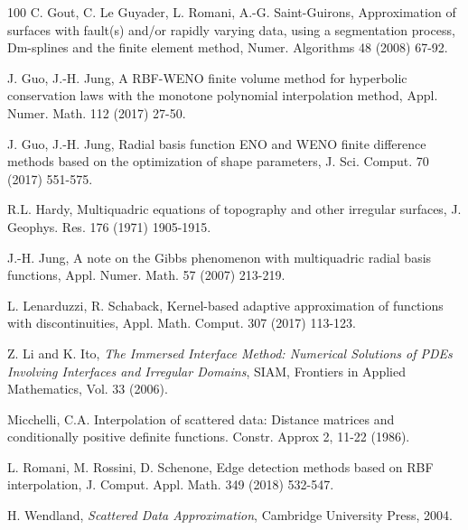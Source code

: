 \documentclass[preprint]{elsarticle}       %
\begin{document}
\begin{thebibliography}{100}
 C. Gout, C. Le Guyader, L. Romani, A.-G. Saint-Guirons, Approximation of surfaces with fault(s) and/or rapidly varying data, using a segmentation process, Dm-splines and the finite element method, Numer. Algorithms 48 (2008) 67-92.

 J. Guo, J.-H. Jung, A RBF-WENO finite volume method for hyperbolic conservation laws with the monotone polynomial interpolation method, Appl. Numer. Math. 112 (2017) 27-50.

 J. Guo, J.-H. Jung, Radial basis function ENO and WENO finite difference methods based on the optimization of shape parameters, J. Sci. Comput. 70 (2017) 551-575.

 R.L. Hardy, Multiquadric equations of topography and other irregular surfaces, J. Geophys. Res. 176 (1971) 1905-1915.

 J.-H. Jung, A note on the Gibbs phenomenon with multiquadric radial basis functions, Appl. Numer. Math. 57 (2007) 213-219.

 L. Lenarduzzi, R. Schaback, Kernel-based adaptive approximation of functions with discontinuities, Appl. Math. Comput. 307 (2017) 113-123.

 Z. Li and K. Ito, \textit{The Immersed Interface Method: Numerical Solutions of PDEs Involving Interfaces and Irregular Domains}, SIAM, Frontiers in Applied Mathematics, Vol. 33 (2006).

 Micchelli, C.A. Interpolation of scattered data: Distance matrices and conditionally positive definite functions. Constr. Approx 2, 11-22 (1986).

 L. Romani, M. Rossini, D. Schenone, Edge detection methods based on RBF interpolation, J. Comput. Appl. Math. 349 (2018) 532-547.

 H. Wendland, \textit{Scattered Data Approximation}, Cambridge University Press, 2004.

\end{thebibliography}
\end{document}
